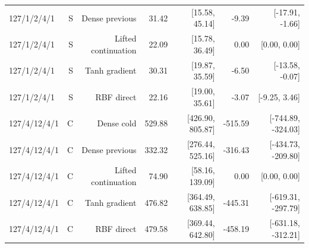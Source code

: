 \begin{table}[tbp]
\begin{tabular}{lrrrrrr}
127/1/2/4/1 & S & Dense previous & 31.42 & [15.58, 45.14] & -9.39 & [-17.91, -1.66]\\
127/1/2/4/1 & S & Lifted continuation & 22.09 & [15.78, 36.49] & 0.00 & [0.00, 0.00]\\
127/1/2/4/1 & S & Tanh gradient & 30.31 & [19.87, 35.59] & -6.50 & [-13.58, -0.07]\\
127/1/2/4/1 & S & RBF direct & 22.16 & [19.00, 35.61] & -3.07 & [-9.25, 3.46]\\
127/4/12/4/1 & C & Dense cold & 529.88 & [426.90, 805.87] & -515.59 & [-744.89, -324.03]\\
127/4/12/4/1 & C & Dense previous & 332.32 & [276.44, 525.16] & -316.43 & [-434.73, -209.80]\\
127/4/12/4/1 & C & Lifted continuation & 74.90 & [58.16, 139.09] & 0.00 & [0.00, 0.00]\\
127/4/12/4/1 & C & Tanh gradient & 476.82 & [364.49, 638.85] & -445.31 & [-619.31, -297.79]\\
127/4/12/4/1 & C & RBF direct & 479.58 & [369.44, 642.80] & -458.19 & [-631.18, -312.21]\\
\bottomrule
\end{tabular}
\end{table}

